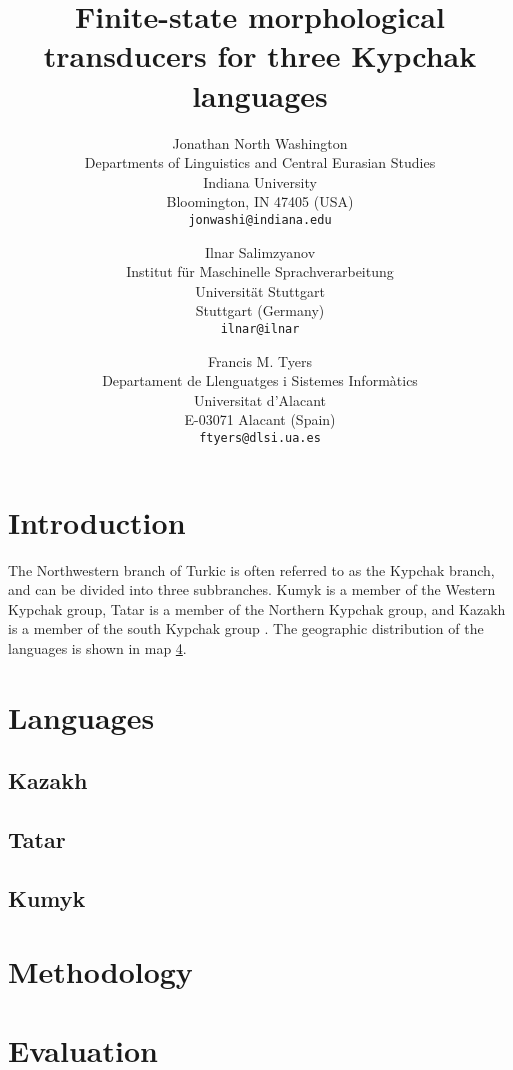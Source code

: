 \documentclass[a4paper,11pt,twocolumn]{article}
\title{Finite-state morphological transducers for three Kypchak languages}
\author{Jonathan North Washington \\
Departments of Linguistics and Central Eurasian Studies\\
Indiana University\\
Bloomington, IN 47405 (USA)\\
\texttt{jonwashi@indiana.edu} \and
Ilnar Salimzyanov  \\
Institut für Maschinelle Sprachverarbeitung \\
Universität Stuttgart\\
Stuttgart (Germany) \\
\texttt{ilnar@ilnar} \and 
Francis M. Tyers\\
Departament de Llenguatges i Sistemes Informàtics \\  
Universitat d'Alacant\\
E-03071 Alacant (Spain)\\
\texttt{ftyers@dlsi.ua.es} 
}
\begin{document}
\maketitleabstract{}

\section{Introduction}

The Northwestern branch of Turkic is often referred to as the Kypchak branch, and can be divided into three subbranches.  Kumyk is a member of the Western Kypchak group, Tatar is a member of the Northern Kypchak group, and Kazakh is a member of the south Kypchak group \citep[82-83]{histofturkic}.  The geographic distribution of the languages is shown in map \ref{}.

\cite{washington2012}
\cite{salimzyanov2013}
\cite{bekmanova2013}

\section{Languages}

\subsection{Kazakh}

\subsection{Tatar}

\subsection{Kumyk}

\cite{bammatov1960}

\section{Methodology}



\section{Evaluation}
\end{document}
